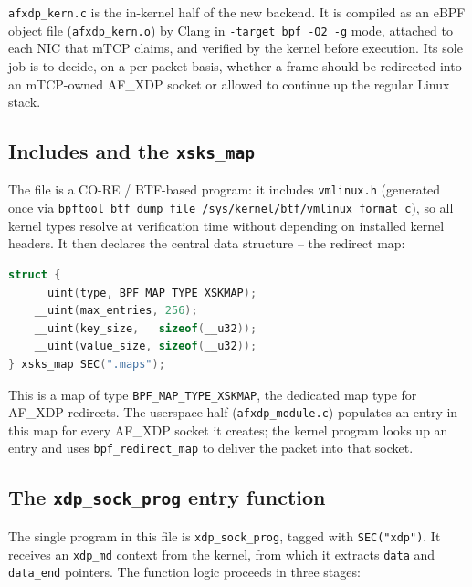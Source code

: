\documentclass[10pt, letterpaper, twocolumn]{article}
\begin{document}
\texttt{afxdp\_kern.c} is the in-kernel half of the new backend. It is compiled as an eBPF object file (\texttt{afxdp\_kern.o}) by Clang in \texttt{-target bpf -O2 -g} mode, attached to each NIC that mTCP claims, and verified by the kernel before execution. Its sole job is to decide, on a per-packet basis, whether a frame should be redirected into an mTCP-owned AF\_XDP socket or allowed to continue up the regular Linux stack.

\subsection{Includes and the \texttt{xsks\_map}}

The file is a CO-RE / BTF-based program: it includes \texttt{vmlinux.h} (generated once via \texttt{bpftool btf dump file /sys/kernel/btf/vmlinux format c}), so all kernel types resolve at verification time without depending on installed kernel headers. It then declares the central data structure -- the redirect map:

\begin{lstlisting}[language=C]
struct {
    __uint(type, BPF_MAP_TYPE_XSKMAP);
    __uint(max_entries, 256);
    __uint(key_size,   sizeof(__u32));
    __uint(value_size, sizeof(__u32));
} xsks_map SEC(".maps");
\end{lstlisting}

This is a map of type \texttt{BPF\_MAP\_TYPE\_XSKMAP}, the dedicated map type for AF\_XDP redirects. The userspace half (\texttt{afxdp\_module.c}) populates an entry in this map for every AF\_XDP socket it creates; the kernel program looks up an entry and uses \texttt{bpf\_redirect\_map} to deliver the packet into that socket.

\subsection{The \texttt{xdp\_sock\_prog} entry function}

The single program in this file is \texttt{xdp\_sock\_prog}, tagged with \texttt{SEC("xdp")}. It receives an \texttt{xdp\_md} context from the kernel, from which it extracts \texttt{data} and \texttt{data\_end} pointers. The function logic proceeds in three stages:
\end{document}
